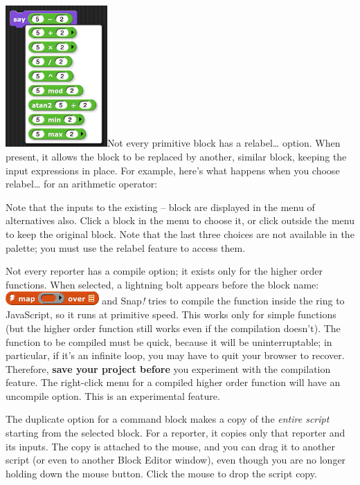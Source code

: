 \includegraphics[width=1.53in,height=2.13in]{media/image1071.png}Not
every primitive block has a relabel\ldots{} option. When present, it
allows the block to be replaced by another, similar block, keeping the
input expressions in place. For example, here's what happens when you
choose relabel\ldots{} for an arithmetic operator:

Note that the inputs to the existing -- block are displayed in the menu
of alternatives also. Click a block in the menu to choose it, or click
outside the menu to keep the original block. Note that the last three
choices are not available in the palette; you must use the relabel
feature to access them.

Not every reporter has a compile option; it exists only for the higher
order functions. When selected, a lightning bolt appears before the
block name:
\includegraphics[width=1.40278in,height=0.20139in]{media/image1072.png}
and Snap\emph{!} tries to compile the function inside the ring to
JavaScript, so it runs at primitive speed. This works only for simple
functions (but the higher order function still works even if the
compilation doesn't). The function to be compiled must be quick, because
it will be uninterruptable; in particular, if it's an infinite loop, you
may have to quit your browser to recover. Therefore, \textbf{save your
project before} you experiment with the compilation feature. The
right-click menu for a compiled higher order function will have an
uncompile option. This is an experimental feature.

The duplicate option for a command block makes a copy of the
\emph{entire script} starting from the selected block. For a reporter,
it copies only that reporter and its inputs. The copy is attached to the
mouse, and you can drag it to another script (or even to another Block
Editor window), even though you are no longer holding down the mouse
button. Click the mouse to drop the script copy.

